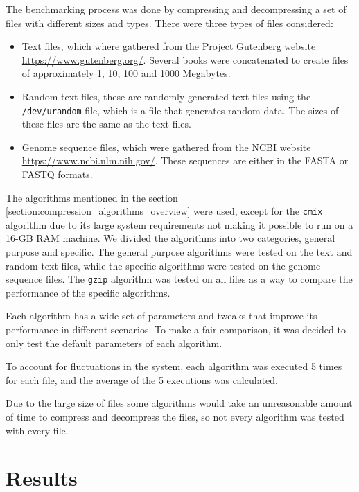     The benchmarking process was done by compressing and decompressing a set of files with different sizes and types. There were three types of files considered:
    \begin{itemize}
        \item Text files, which where gathered from the Project Gutenberg website \url{https://www.gutenberg.org/}.
        Several books were concatenated to create files of approximately 1, 10, 100 and 1000 Megabytes.
        \item Random text files, these are randomly generated text files using the \texttt{/dev/urandom} file, which is a file that generates random data. The sizes of these files are the same as the text files.
        \item Genome sequence files, which were gathered from the NCBI website \url{https://www.ncbi.nlm.nih.gov/}. These sequences are either in the FASTA or FASTQ formats.
    \end{itemize}
    
    The algorithms mentioned in the section \ref{section:compression_algorithms_overview} were used, except for the \texttt{cmix} algorithm due to its large system requirements not making it possible to run on a 16-GB RAM machine. We divided the algorithms into two categories, general purpose and specific. The general purpose algorithms were tested on the text and random text files, while the specific algorithms were tested on the genome sequence files. The \texttt{gzip} algorithm was tested on all files as a way to compare the performance of the specific algorithms.


    Each algorithm has a wide set of parameters and tweaks that improve its performance in different scenarios. To make a fair comparison, it was decided to only test the default parameters of each algorithm.

    To account for fluctuations in the system, each algorithm was executed 5 times for each file, and the average of the 5 executions was calculated.

    Due to the large size of files some algorithms would take an unreasonable amount of time to compress and decompress the files, so not every algorithm was tested with every file.
    

\section{Results}

